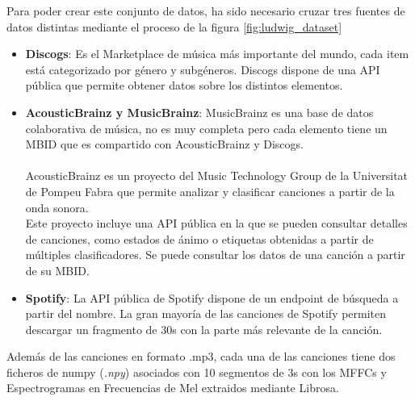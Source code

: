 Para poder crear este conjunto de datos, ha sido necesario cruzar tres
fuentes de datos distintas mediante el proceso de la figura \ref{fig:ludwig_dataset}
\begin{itemize}
\itemsep0em
\item
  \textbf{Discogs}: Es el Marketplace de música más importante del mundo, cada
  item está categorizado por género y subgéneros. Discogs dispone de una
  API pública que permite obtener datos sobre los distintos elementos.
\item
  \textbf{AcousticBrainz y MusicBrainz}: MusicBrainz \cite{musicbrainz} es una base de datos
  colaborativa de música, no es muy completa pero cada elemento tiene un
  MBID que es compartido con AcousticBrainz y Discogs.\\
  ~\\
  AcousticBrainz es un proyecto del Music Technology Group de la
  Universitat de Pompeu Fabra \cite{bogdanov2019acousticbrainz} que permite analizar y clasificar
  canciones a partir de la onda sonora.\\
  Este proyecto incluye una API pública en la que se pueden consultar detalles de
  canciones, como estados de ánimo o etiquetas obtenidas a partir de múltiples clasificadores. Se puede consultar los datos de una canción a partir de su MBID.
\item
  \textbf{Spotify}: La API pública de Spotify dispone de un endpoint de búsqueda a partir del
  nombre. La gran mayoría de las canciones de Spotify permiten descargar
  un fragmento de 30s con la parte más relevante de la canción.
\end{itemize}

Además de las canciones en formato .mp3, cada una de las canciones tiene dos ficheros de numpy (\textit{.npy}) asociados con 10 segmentos de 3s con los  MFFCs y Espectrogramas en Frecuencias de Mel extraidos mediante Librosa.

